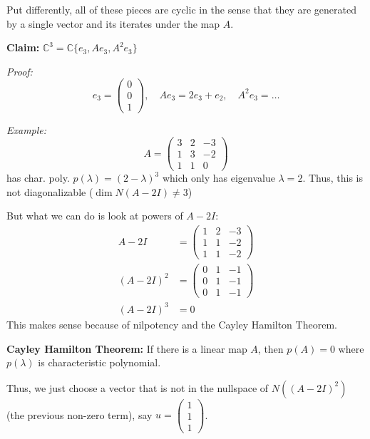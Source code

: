 \documentclass[12pt]{article}
\newcommand{\C}{\mathbb{C}}
\begin{document}
    Put differently, all of these pieces are cyclic in the sense that they are generated by a single vector and its iterates under the map $A$. 

    \textbf{Claim:} $\C^3 = \C\{e_3, Ae_3, A^2 e_3\}$ 

    \emph{Proof:} 
    \[e_3 = \begin{pmatrix}
        0\\0\\1
    \end{pmatrix}, \quad Ae_3 = 2e_3 + e_2, \quad A^2 e_3 = \dots\]

    \emph{Example:} 
    \[A = \begin{pmatrix}
        3 & 2 & -3\\ 
        1 & 3 & -2\\ 
        1 & 1 & 0
    \end{pmatrix}\]
    has char. poly. $p(\lambda) = (2 - \lambda)^3$ which only has eigenvalue $\lambda = 2$. Thus, this is not diagonalizable ($\dim N(A - 2I) \neq 3$) 

    But what we can do is look at powers of $A - 2I$:
    \begin{align*}
        A - 2I &= \begin{pmatrix}
            1 & 2 & -3\\ 
            1 & 1 & -2\\ 
            1 & 1 & -2
        \end{pmatrix}\\ 
        (A - 2I)^2 &= \begin{pmatrix}
            0 & 1 & -1\\ 
            0 & 1 & -1\\ 
            0 & 1 & -1
        \end{pmatrix}\\ 
        (A - 2I)^3 &= 0
    \end{align*} 
    This makes sense because of nilpotency and the Cayley Hamilton Theorem. 

    \textbf{Cayley Hamilton Theorem:} If there is a linear map $A$, then $p(A) = 0$ where $p(\lambda)$ is characteristic polynomial.

    Thus, we just choose a vector that is not in the nullspace of $N((A- 2I)^2)$ (the previous non-zero term), say $u = \begin{pmatrix}
        1\\1\\1
    \end{pmatrix}$. 
\end{document}
